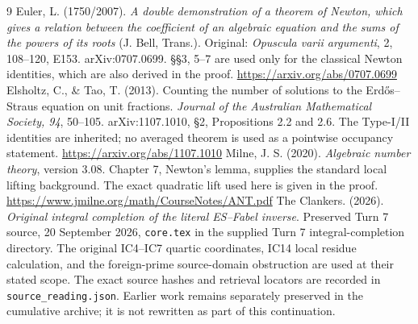 \begin{thebibliography}{9}
Euler, L. (1750/2007). \emph{A double demonstration of a theorem of Newton, which
gives a relation between the coefficient of an algebraic equation and the sums
of the powers of its roots} (J. Bell, Trans.). Original: \emph{Opuscula varii
argumenti}, 2, 108--120, E153. arXiv:0707.0699. \S\S3, 5--7 are used only for
the classical Newton identities, which are also derived in the proof.
\url{https://arxiv.org/abs/0707.0699}
Elsholtz, C., \& Tao, T. (2013). Counting the number of solutions to the
Erd\H{o}s--Straus equation on unit fractions. \emph{Journal of the Australian
Mathematical Society, 94}, 50--105. arXiv:1107.1010, \S2, Propositions 2.2 and
2.6. The Type-I/II identities are inherited; no averaged theorem is used as a
pointwise occupancy statement. \url{https://arxiv.org/abs/1107.1010}
Milne, J. S. (2020). \emph{Algebraic number theory}, version 3.08.
Chapter 7, Newton's lemma, supplies the standard local lifting background.
The exact quadratic lift used here is given in the proof.
\url{https://www.jmilne.org/math/CourseNotes/ANT.pdf}
The Clankers. (2026). \emph{Original integral completion of the literal
ES--Fabel inverse}. Preserved Turn 7 source, 20 September 2026,
\texttt{core.tex} in the supplied Turn 7 integral-completion directory.
The original IC4--IC7 quartic coordinates, IC14 local residue calculation, and
the foreign-prime source-domain obstruction are used at their stated scope.
The exact source hashes and retrieval locators are recorded in
\texttt{source\_reading.json}. Earlier work remains separately preserved in the
cumulative archive; it is not rewritten as part of this continuation.
\end{thebibliography}
